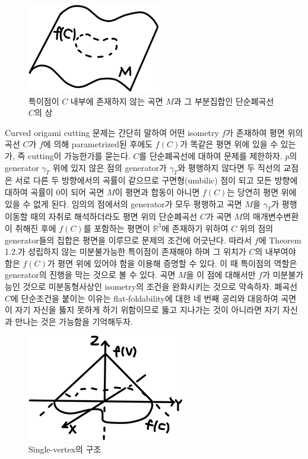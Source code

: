 \documentclass[11pt]{article}
\begin{document}
\begin{figure}
\centering
\includegraphics{2.png}
\caption{특이점이 $C$ 내부에 존재하지 않는 곡면 $M$과 그 부분집합인 단순폐곡선 $C$의 상}
\end{figure}


Curved origami cutting 문제는 간단히 말하여 어떤 isometry $f$가 존재하여 평면 위의 곡선 $C$가 $f$에 의해 parametrized된 후에도 $f(C)$가 똑같은 평면 위에 있을 수 있는가, 즉 cutting이 가능한가를 묻는다. $C$를 단순폐곡선에 대하여 문제를 제한하자. $p$의 generator $\gamma _T$ 위에 있지 않은 점의 generator가 $\gamma _T$와 평행하지 않다면 두 직선의 교점은 서로 다른 두 방향에서의 곡률이 같으므로 구면형(umbilic) 점이 되고 모든 방향에 대하여 곡률이 0이 되어 곡면 $M$이 평면과 합동이 아니면 $f(C)$는 당연히 평면 위에 있을 수 없게 된다. 임의의 점에서의 generator가 모두 평행하고 곡면 $M$을 $\gamma_T$가 평행이동할 때의 자취로 해석하더라도 평면 위의 단순폐곡선 $C$가 곡면 $M$의 매개변수변환이 취해진 후에 $f(C)$를 포함하는 평면이 ${\mathbb R}^3$에 존재하기 위하여 $C$ 위의 점의 generator들의 집합은 평면을 이루므로 문제의 조건에 어긋난다. 따라서 $f$에 Theorem 1.2.가 성립하지 않는 미분불가능한 특이점이 존재해야 하며 그 위치가 $C$의 내부여야 함은 $f(C)$가 평면 위에 있어야 함을 이용해 증명할 수 있다. 이 때 특이점의 역할은 generator의 진행을 막는 것으로 볼 수 있다. 곡면 $M$을 이 점에 대해서만 $f$가 미분불가능인 것으로 미분동형사상인 isometry의 조건을 완화시키는 것으로 약속하자. 폐곡선 $C$에 단순조건을 붙이는 이유는 flat-foldability에 대한 네 번째 공리와 대응하여 곡면이 자기 자신을 뚫지 못하게 하기 위함이므로 뚫고 지나가는 것이 아니라면 자기 자신과 만나는 것은 가능함을 기억해두자.


\begin{figure}
\centering
\includegraphics{3.png}
\caption{Single-vertex의 구조}
\end{figure}
\end{document}
